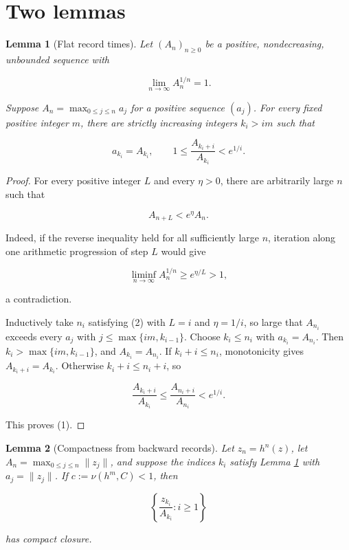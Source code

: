 \documentclass[11pt]{article}
\newtheorem{lemma}{Lemma}
\begin{document}
\section{Two lemmas}

\begin{lemma}[Flat record times]\label{lem:records}
Let \((A_n)_{n\ge0}\) be a positive, nondecreasing, unbounded sequence with

\[
  \lim_{n\to\infty} A_n^{1/n}=1.
\]

Suppose \(A_n=\max_{0\le j\le n}a_j\) for a positive sequence \((a_j)\).
For every fixed positive integer \(m\), there are strictly increasing
integers \(k_i>im\) such that

\[
  a_{k_i}=A_{k_i},
  \qquad
  1\le \frac{A_{k_i+i}}{A_{k_i}}<e^{1/i}.
  \tag{1}
\]
\end{lemma}

\begin{proof}
For every positive integer \(L\) and every \(\eta>0\), there are arbitrarily
large \(n\) such that

\[
  A_{n+L}<e^\eta A_n. \tag{2}
\]

Indeed, if the reverse inequality held for all sufficiently large \(n\),
iteration along one arithmetic progression of step \(L\) would give

\[
  \liminf_{n\to\infty}A_n^{1/n}\ge e^{\eta/L}>1,
\]

a contradiction.

Inductively take \(n_i\) satisfying (2) with \(L=i\) and
\(\eta=1/i\), so large that \(A_{n_i}\) exceeds every \(a_j\) with
\(j\le\max\{im,k_{i-1}\}\). Choose \(k_i\le n_i\) with
\(a_{k_i}=A_{n_i}\). Then \(k_i>\max\{im,k_{i-1}\}\), and
\(A_{k_i}=A_{n_i}\). If \(k_i+i\le n_i\), monotonicity gives
\(A_{k_i+i}=A_{k_i}\). Otherwise \(k_i+i\le n_i+i\), so

\[
 \frac{A_{k_i+i}}{A_{k_i}}
 \le \frac{A_{n_i+i}}{A_{n_i}}<e^{1/i}.
\]

This proves (1).
\end{proof}

\begin{lemma}[Compactness from backward records]\label{lem:compact}
Let \(z_n=h^n(z)\), let \(A_n=\max_{0\le j\le n}\|z_j\|\), and suppose
the indices \(k_i\) satisfy Lemma \ref{lem:records} with
\(a_j=\|z_j\|\). If \(c:=\nu(h^m,C)<1\), then

\[
  \left\{\frac{z_{k_i}}{A_{k_i}}:i\ge1\right\}
\]

has compact closure.
\end{lemma}
\end{document}
